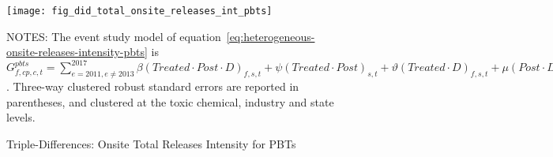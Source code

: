 \begin{figure}[H]
    \centering
    \texttt{[image: fig\_did\_total\_onsite\_releases\_int\_pbts]}
    \caption{Triple-Differences: Onsite Total Releases Intensity for PBTs}
    \label{fig:heterogeneous-onsite-releases-intensity-pbts}
    \begin{minipage}{18cm}
        \vspace{0.05in}
        NOTES: The event study model of equation~\ref{eq:heterogeneous-onsite-releases-intensity-pbts} is $G_{f,cp,c,t}^{pbts} = \sum_{{e = 2011},{e \neq 2013}}^{2017} \beta (Treated \cdot Post \cdot D)_{f,s,t} + \psi (Treated \cdot Post)_{s,t} + \vartheta (Treated \cdot D)_{f,s,t} + \mu (Post \cdot D)_{f,s,t} + \tau Treated_{s,t} + \rho D_{f,s,t} + \alpha Post_{t} + \delta X_{v,c,t-1} + \omega F_{f,t} + \lambda_{t} + \gamma_{f} + \phi_{cp} + \zeta_{c} + \eta_{c,t} + \varepsilon_{f,cp,c,t}$. Three-way clustered robust standard errors are reported in parentheses, and clustered at the toxic chemical, industry and state levels.
    \end{minipage}
\end{figure}